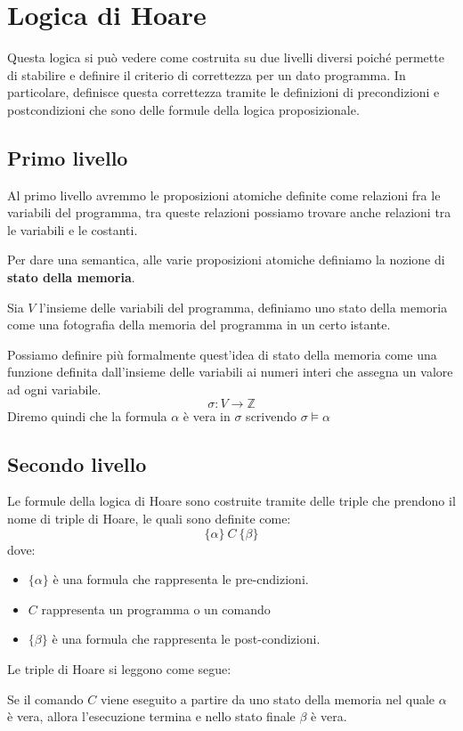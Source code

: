 \section{Logica di Hoare}
Questa logica si può vedere come costruita su due livelli diversi poiché permette di stabilire e definire il criterio di correttezza per un dato programma. In particolare, definisce questa correttezza tramite le definizioni di precondizioni e postcondizioni che sono delle formule della logica proposizionale.
\subsection{Primo livello}
Al primo livello avremmo le proposizioni atomiche definite come relazioni fra le variabili del programma, tra queste relazioni possiamo trovare anche relazioni tra le variabili e le costanti.

Per dare una semantica, alle varie proposizioni atomiche definiamo la nozione di \textbf{stato della memoria}.
\begin{definizione}
    Sia $V$ l'insieme delle variabili del programma, definiamo uno stato della memoria come una fotografia della memoria del programma in un certo istante.

    Possiamo definire più formalmente quest'idea di stato della memoria come una funzione definita dall'insieme delle variabili ai numeri interi che assegna un valore ad ogni variabile.
    \begin{equation}
        \sigma: V \to \mathbb{Z}
    \end{equation}
    Diremo quindi che la formula $\alpha$ è vera in $\sigma$ scrivendo $\sigma \models \alpha$
\end{definizione}
\subsection{Secondo livello}
Le formule della logica di Hoare sono costruite tramite delle triple che prendono il nome di triple di Hoare, le quali sono definite come: 
\begin{equation}
    \{\alpha\} \ C \ \{\beta\}
\end{equation}
dove:
\begin{itemize}
    \item $\{\alpha\}$ è una formula che rappresenta le pre-cndizioni.
    \item $C$ rappresenta un programma o un comando
    \item $\{\beta\}$ è una formula che rappresenta le post-condizioni.
\end{itemize}
Le triple di Hoare si leggono come segue:
\begin{center}
    Se il comando $C$ viene eseguito a partire da uno stato della memoria nel quale $\alpha$ è vera, allora l'esecuzione termina e nello stato finale $\beta$ è vera.
\end{center}
